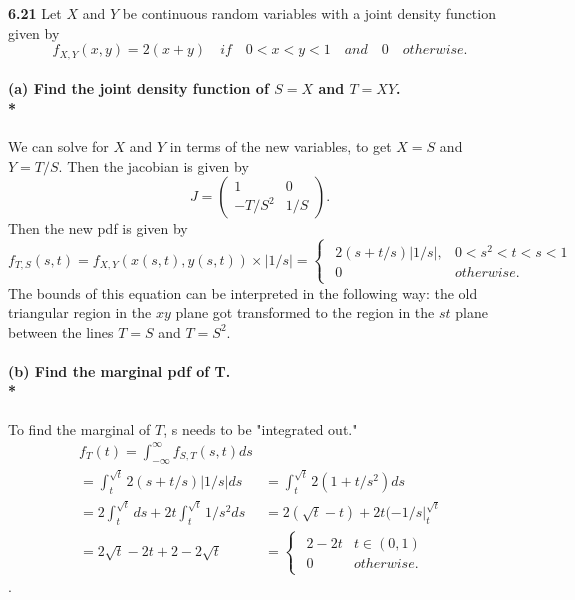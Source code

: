 {\bf 6.21}
Let $X$ and $Y$ be continuous random variables with a joint density function given by 
\begin{equation} f_{X,Y}(x,y)=2(x+y) \quad if \quad 0<x<y<1 \quad and\quad 0 \quad otherwise. \end{equation}
\paragraph{(a) Find the joint density function of $S=X$ and $T=XY$. \\*} 
We can solve for $X$ and $Y$ in terms of the new variables, to get $X=S$ and $Y=T/S$.  Then the jacobian is given by 
\begin{equation} J=\left(
\begin{array}{cc} 1 & 0 \\ -T/S^2 & 1/S \end{array}\right). \end{equation}
Then the new pdf is given by 
\begin{equation} f_{T,S}(s,t)=f_{X,Y}(x(s,t),y(s,t))\times |1/s| = \begin{cases}
\begin{array}{lc} 2(s+t/s)\left|1/s\right|, & 0<s^2<t<s<1 \\ 
0 & otherwise. \end{array} \end{cases} \end{equation}
The bounds of this equation can be interpreted in the following way:  the old triangular region in the $xy$ plane got transformed to the region in the $st$ plane between the lines $T=S$ and $T=S^2$. 
\paragraph{(b) Find the marginal pdf of T. \\*}
To find the marginal of $T$, s needs to be "integrated out." 
\begin{equation}\begin{split}  f_T(t)=\int_{-\infty}^{\infty}f_{S,T}(s,t)ds \\ 
= \int_{t}^{\sqrt{t}}2(s+t/s)\left|1/s\right|ds
&= \int_{t}^{\sqrt{t}}2(1+t/s^2)ds \\
=2\int_{t}^{\sqrt{t}}ds+2t\int_{t}^{\sqrt{t}}1/s^2ds
&=2(\sqrt{t} -t)+2t(-1/s\rvert^{\sqrt{t}}_{t}\\ 
=2\sqrt{t} -2t +2 -2\sqrt{t} &= \begin{cases} \begin{array} {lc} 2-2t & t \in (0,1)\\ 0 & otherwise. \end{array} \end{cases} \end{split} \end{equation}.
\\
